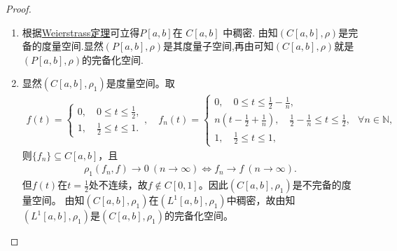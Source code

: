 \documentclass[../../main.tex]{subfiles}%
\begin{document}
\begin{proof}
\begin{enumerate}[(1)]
\item 根据\hyperref[Basis-of-Analytics-theorem:多项式逼近有限阶光滑函数]{Weierstrass定理}可立得$P[a,b]$在 $C[a,b]$ 中稠密. 由知$(C[a,b],\rho)$是完备的度量空间.显然$(P[a,b],\rho)$是其度量子空间,再由可知$(C[a,b],\rho)$就是$(P[a,b],\rho)$的完备化空间.

\item 显然$(C[a,b],\rho_1)$是度量空间。取
\begin{align*}
f(t)=
\begin{cases}
0,\quad 0\leqslant t\leqslant \frac{1}{2},\\
1,\quad \frac{1}{2}\leqslant t\leqslant 1.
\end{cases},\quad f_n(t)=
\begin{cases}
0,\quad 0\leqslant t\leqslant \frac{1}{2}-\frac{1}{n},\\
n\left(t-\frac{1}{2}+\frac{1}{n}\right),\quad \frac{1}{2}-\frac{1}{n}\leqslant t\leqslant \frac{1}{2},\\
1,\quad \frac{1}{2}\leqslant t\leqslant 1,
\end{cases}
\,\, \forall n\in\mathbb{N},
\end{align*}
则$\{f_n\}\subseteq C[a,b]$，且
\begin{align*}
\rho_1(f_n,f)\to 0\ (n\to\infty)\Longleftrightarrow f_n\to f\ (n\to\infty).
\end{align*}
但$f(t)$在$t=\frac{1}{2}$处不连续，故$f\notin C[0,1]$。因此$(C[a,b],\rho_1)$是不完备的度量空间。
由知$(C[a,b],\rho_1)$在$(L^1[a,b],\rho_1)$中稠密，故由知$(L^1[a,b],\rho_1)$是$(C[a,b],\rho_1)$的完备化空间。
\end{enumerate}

\end{proof}
\end{document}
